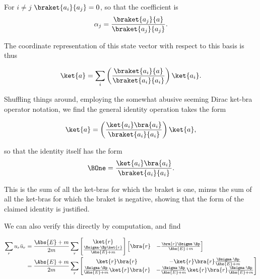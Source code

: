 For $i \ne j$ $\braket{a_i}{a_j} = 0$, so that the coefficient is
\begin{equation}\label{eqn:desaiDiracAdjoint:600}
\alpha_j =
\frac{\braket{a_j}{a}}{\braket{a_j}{a_j}}.
\end{equation}

The coordinate representation of this state vector with respect to this basis is thus

\begin{equation}\label{eqn:desaiDiracAdjoint:620}
\ket{a} 
= 
\sum_i \left( \frac{\braket{a_i}{a}}{\braket{a_i}{a_i}} \right)
\ket{a_i}.
\end{equation}

Shuffling things around, employing the somewhat abusive seeming Dirac ket-bra operator notation, we find the general identity operation takes the form

\begin{equation}\label{eqn:desaiDiracAdjoint:640}
\ket{a} = \left( \frac{\ket{a_i} \bra{a_i} }{\braket{a_i}{a_i}} \right) \ket{a},
\end{equation}

so that the identity itself has the form
\begin{equation}\label{eqn:desaiDiracAdjoint:660}
\BOne = \frac{\ket{a_i} \bra{a_i} }{\braket{a_i}{a_i}}.
\end{equation}

This is the sum of all the ket-bras for which the braket is one, minus the sum of all the ket-bras for which the braket is negative, showing that the form of the claimed identity is justified.

We can also verify this directly by computation, and find

\begin{align*}
\sum_r u_r \bar{u}_r 
&=
\frac{\Abs{E} + m}{2m}
\sum_r 
\begin{bmatrix}
\ket{r} \\
\frac{\Bsigma \cdot \Bp \ket{r}}{\Abs{E} + m}
\end{bmatrix}
\begin{bmatrix}
\bra{r} &
-\frac{\bra{r} \Bsigma \cdot \Bp}{\Abs{E} + m}
\end{bmatrix} \\
&=
\frac{\Abs{E} + m}{2m}
\sum_r 
\begin{bmatrix}
\ket{r}\bra{r} & -\ket{r}\bra{r} \frac{\Bsigma \cdot \Bp}{\Abs{E} + m} \\
\frac{\Bsigma \cdot \Bp}{\Abs{E} + m} \ket{r}\bra{r} &
-\frac{\Bsigma \cdot \Bp}{\Abs{E} + m} \ket{r}\bra{r} \frac{\Bsigma \cdot \Bp}{\Abs{E} + m}  \\
\end{bmatrix}
\end{align*}

